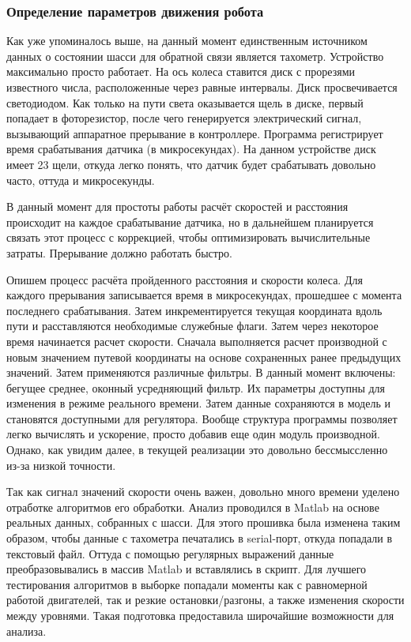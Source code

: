 \documentclass[14pt,a4paper,russian]{scrartcl}
\begin{document}
\subsubsection{Определение параметров движения робота}
Как уже упоминалось выше, на данный момент единственным источником данных
о состоянии шасси для обратной связи является тахометр. Устройство максимально просто работает.
На ось колеса ставится диск с прорезями известного числа, расположенные через
равные интервалы. Диск просвечивается светодиодом. Как только на пути света оказывается
щель в диске, первый попадает в фоторезистор, после чего генерируется электрический
сигнал, вызывающий аппаратное прерывание в контроллере. Программа регистрирует
время срабатывания датчика (в микросекундах). На данном устройстве диск имеет 23 щели,
откуда легко понять, что датчик будет срабатывать довольно часто, оттуда и микросекунды.

В данный момент для простоты работы расчёт скоростей и расстояния происходит на каждое
срабатывание датчика, но в дальнейшем планируется связать этот процесс с 
коррекцией, чтобы оптимизировать вычислительные затраты. Прерывание должно работать быстро.

Опишем процесс расчёта пройденного расстояния и скорости колеса. Для каждого прерывания
записывается время в микросекундах, прошедшее с момента последнего срабатывания.
Затем инкрементируется текущая координата вдоль пути и расставляются необходимые
служебные флаги. Затем через некоторое время начинается расчет скорости. Сначала выполняется
расчет производной с новым значением путевой координаты на основе сохраненных ранее
предыдущих значений. Затем применяются различные фильтры. В данный момент включены: бегущее
среднее, оконный усредняющий фильтр. Их параметры доступны для изменения в режиме
реального времени. Затем данные сохраняются в модель и становятся доступными для регулятора. 
Вообще структура программы позволяет легко вычислять и ускорение, просто добавив
еще один модуль производной. Однако, как увидим далее, в текущей реализации это
довольно бессмыссленно из-за низкой точности.

Так как сигнал значений скорости очень важен, довольно много времени
уделено отработке алгоритмов его обработки. Анализ проводился в Matlab 
на основе реальных данных, собранных с шасси. Для этого прошивка была изменена
таким образом, чтобы данные с тахометра печатались в serial-порт, откуда попадали в текстовый файл.
Оттуда с помощью регулярных выражений данные преобразовывались в массив Matlab и вставлялись в скрипт.
Для лучшего тестирования алгоритмов в выборке попадали моменты как с равномерной работой двигателей,
так и резкие остановки/разгоны, а также изменения скорости между уровнями. 
Такая подготовка предоставила широчайшие возможности для анализа.
\end{document}
